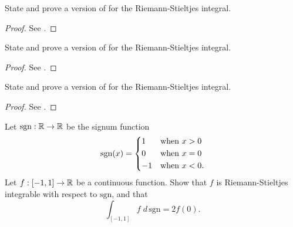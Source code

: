 \begin{ex}\label{i:ex:11.8.2}
  State and prove a version of  for the Riemann-Stieltjes integral.
\end{ex}

\begin{proof}
  See .
\end{proof}

\begin{ex}\label{i:ex:11.8.3}
  State and prove a version of  for the Riemann-Stieltjes integral.
\end{ex}

\begin{proof}
  See .
\end{proof}

\begin{ex}\label{i:ex:11.8.4}
  State and prove a version of  for the Riemann-Stieltjes integral.
\end{ex}

\begin{proof}
  See .
\end{proof}

\begin{ex}\label{i:ex:11.8.5}
  Let \(\text{sgn} : \mathbb{R} \to \mathbb{R}\) be the signum function
  \[
    \text{sgn}(x) = \begin{dcases}
      1  & \text{when } x > 0  \\
      0  & \text{when } x = 0  \\
      -1 & \text{when } x < 0.
    \end{dcases}
  \]
  Let \(f : [-1, 1] \to \mathbb{R}\) be a continuous function.
  Show that \(f\) is Riemann-Stieltjes integrable with respect to \(\text{sgn}\), and that
  \[
    \int_{[-1, 1]} f \; d \, \text{sgn} = 2f(0).
  \]
\end{ex}

